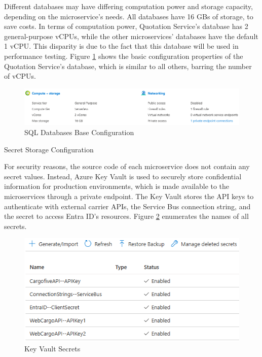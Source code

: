 \documentclass[12pt, reqno, oneside]{amsbook}
\makeatletter
\def\subsection{\@startsection{subsection}{2}%
      \z@{.5\linespacing\@plus.7\linespacing}{.25\linespacing}%
      {\normalfont\bfseries\flushleft}}
\theoremstyle{definition}
\theoremstyle{definition}
\numberwithin{section}{chapter}
\numberwithin{table}{chapter}
\numberwithin{figure}{chapter}
\makeatother
\begin{document}
Different databases may have differing computation power and storage capacity, depending on the microservice's needs. All databases have 16 \acp{GB} of storage, to save costs. In terms of computation power, Quotation Service's database has 2 general-purpose \acp{vCPU}, while the other microservices' databases have the default 1 \ac{vCPU}. This disparity is due to the fact that this database will be used in performance testing. Figure \ref{Figure:DatabaseConfigurationBase} shows the basic configuration properties of the Quotation Service's database, which is similar to all others, barring the number of \acp{vCPU}.

\begin{figure}[H]
  \centering
  \includegraphics[width=0.9\linewidth]{images/DatabaseConfigurationBase.png}
  \caption{\label{Figure:DatabaseConfigurationBase}SQL Databases Base Configuration}
\end{figure}

\subsection{Secret Storage Configuration}

For security reasons, the source code of each microservice does not contain any secret values. Instead, Azure Key Vault is used to securely store confidential information for production environments, which is made available to the microservices through a private endpoint. The Key Vault stores the \ac{API} keys to authenticate with external carrier \acp{API}, the Service Bus connection string, and the secret to access Entra ID's resources. Figure \ref{Figure:KeyVaultSecrets} enumerates the names of all secrets.

\begin{figure}[H]
  \centering
  \includegraphics[width=0.8\linewidth]{images/KeyVaultSecrets.png}
  \caption{\label{Figure:KeyVaultSecrets}Key Vault Secrets}
\end{figure}
\end{document}

